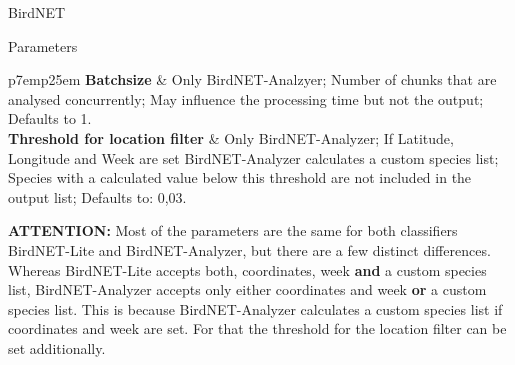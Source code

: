 \documentclass[final,hyperref={pdfpagelabels=false}]{beamer}
\begin{document}
\begin{frame}[fragile]{}
\begin{columns}[t]
\begin{column}{.43\linewidth}
\begin{block}{BirdNET}
\begin{subblock}{Parameters}
{\begin{tabular}{p{7em}p{25em}}
\textbf{Batchsize} & Only BirdNET-Analzyer; Number of chunks that are analysed concurrently; May influence the processing time but not the output; Defaults to 1.\\
\textbf{Threshold for location filter} & Only BirdNET-Analyzer; If Latitude, Longitude and Week are set BirdNET-Analyzer calculates a custom species list; Species with a calculated value below this \mbox{threshold} are not included in the output list; Defaults to: 0,03. \\
\end{tabular}
}
	\end{subblock}
	\textbf{ATTENTION:} Most of the parameters are the same for both classifiers BirdNET-Lite and BirdNET-Analyzer, but there are a few distinct differences.
	Whereas BirdNET-Lite accepts both, coordinates, week \textbf{and} a custom species list, BirdNET-Analyzer accepts only either coordinates and week \textbf{or} a custom species list.
	This is because BirdNET-Analyzer calculates a custom species list if coordinates and week are set.
	For that the threshold for the location filter can be set additionally.

\end{block}
      \end{column}
    \end{columns}
    \vfill
  \end{frame}
  \begin{comment}
  
  \begin{frame}[fragile]{}
    \begin{columns}[t]
      \begin{column}{0.33\linewidth}
        
      \end{column}
      
      \begin{column}{0.33\linewidth}
        
      \end{column}
            
      \begin{column}{0.33\linewidth}
        
      \end{column}
    \end{columns}
  \end{frame}
  \end{comment}
\end{document}
